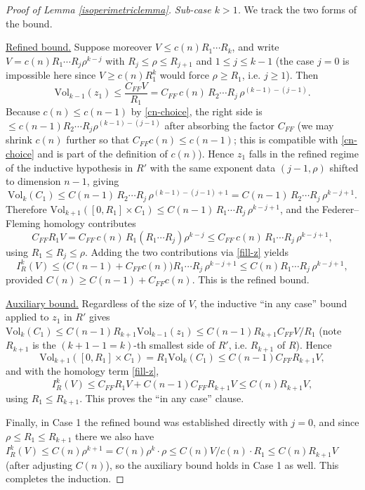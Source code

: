 \documentclass{amsart}
\newtheorem*{theorem 1}{Theorem 1}
\newtheorem*{theorem 2}{Theorem 2}
\newtheorem*{theorem 3}{Theorem 3}
\numberwithin{equation}{section}
\newcommand{\Vol}{\textrm{Vol}}
\begin{document}
\begin{proof} [Proof of Lemma \ref{isoperimetriclemma}]
\emph{Sub-case $k>1$.}  We track the two forms of the bound.

\underline{Refined bound.}  Suppose moreover $V \le c(n) R_1\cdots
R_k$, and write $V = c(n) R_1 \cdots R_j \rho^{k-j}$ with $R_j \le
\rho \le R_{j+1}$ and $1 \le j \le k-1$ (the case $j=0$ is
impossible here since $V \ge c(n) R_1^k$ would force $\rho \ge
R_1$, i.e. $j\ge 1$).  Then
$$ \Vol_{k-1}(z_1) \le \frac{C_{FF} V}{R_1}
   = C_{FF}\, c(n)\, R_2 \cdots R_j\, \rho^{(k-1)-(j-1)}. $$
Because $c(n) \le c(n-1)$ by \eqref{cn-choice}, the right side is
$\le c(n-1) R_2 \cdots R_j \rho^{(k-1)-(j-1)}$ after absorbing the
factor $C_{FF}$ (we may shrink $c(n)$ further so that
$C_{FF} c(n) \le c(n-1)$; this is compatible with \eqref{cn-choice}
and is part of the definition of $c(n)$).  Hence $z_1$ falls in the
refined regime of the inductive hypothesis in $R'$ with the same
exponent data $(j-1,\rho)$ shifted to dimension $n-1$, giving
$$ \Vol_k(C_1) \le C(n-1)\, R_2 \cdots R_j\, \rho^{(k-1)-(j-1)+1}
   = C(n-1)\, R_2 \cdots R_j\, \rho^{k-j+1}. $$
Therefore $\Vol_{k+1}([0,R_1]\times C_1) \le C(n-1)\, R_1 \cdots
R_j\, \rho^{k-j+1}$, and the Federer--Fleming homology contributes
$$ C_{FF} R_1 V = C_{FF}\, c(n)\, R_1 (R_1 \cdots R_j)\rho^{k-j}
   \le C_{FF}\, c(n)\, R_1 \cdots R_j\, \rho^{k-j+1}, $$
using $R_1 \le R_j \le \rho$.  Adding the two contributions via
\eqref{fill-z} yields
$$ I_R^k(V) \le \big(C(n-1) + C_{FF} c(n)\big) R_1 \cdots R_j\,
   \rho^{k-j+1} \le C(n) R_1 \cdots R_j\, \rho^{k-j+1}, $$
provided $C(n) \ge C(n-1) + C_{FF} c(n)$.  This is the refined
bound.

\underline{Auxiliary bound.}  Regardless of the size of $V$, the
inductive ``in any case'' bound applied to $z_1$ in $R'$ gives
$\Vol_k(C_1) \le C(n-1) R_{k+1} \Vol_{k-1}(z_1) \le C(n-1) R_{k+1}
C_{FF} V / R_1$ (note $R_{k+1}$ is the $(k+1-1=k)$-th smallest side
of $R'$, i.e. $R_{k+1}$ of $R$).  Hence
$$ \Vol_{k+1}([0,R_1]\times C_1) = R_1 \Vol_k(C_1)
   \le C(n-1) C_{FF} R_{k+1} V, $$
and with the homology term \eqref{fill-z},
$$ I_R^k(V) \le C_{FF} R_1 V + C(n-1) C_{FF} R_{k+1} V
   \le C(n) R_{k+1} V, $$
using $R_1 \le R_{k+1}$.  This proves the ``in any case'' clause.

\medskip
Finally, in Case 1 the refined bound was established directly with
$j=0$, and since $\rho \le R_1 \le R_{k+1}$ there we also have
$I_R^k(V) \le C(n)\rho^{k+1} = C(n) \rho^k \cdot \rho \le C(n) V /
c(n) \cdot R_1 \le C(n) R_{k+1} V$ (after adjusting $C(n)$), so the
auxiliary bound holds in Case 1 as well.  This completes the
induction.
\end{proof}
\end{document}
